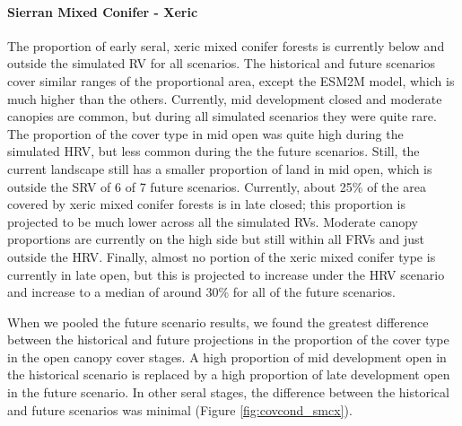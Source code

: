\documentclass[12pt]{article}
\begin{document}
\begin{spacing}{1}
\paragraph{Sierran Mixed Conifer - Xeric} The proportion of early seral, xeric mixed conifer forests is currently below and outside the simulated RV for all scenarios. The historical and future scenarios cover similar ranges of the proportional area, except the ESM2M model, which is much higher than the others. Currently, mid development closed and moderate canopies are common, but during all simulated scenarios they were quite rare. The proportion of the cover type in mid open was quite high during the simulated HRV, but less common during the the future scenarios. Still, the current landscape still has a smaller proportion of land in mid open, which is outside the SRV of 6 of 7 future scenarios. Currently, about 25\% of the area covered by xeric mixed conifer forests is in late closed; this proportion is projected to be much lower across all the simulated RVs. Moderate canopy proportions are currently on the high side but still within all FRVs and just outside the HRV. Finally, almost no portion of the xeric mixed conifer type is currently in late open, but this is projected to increase under the HRV scenario and increase to a median of around 30\% for all of the future scenarios. 

When we pooled the future scenario results, we found the greatest difference between the historical and future projections in the proportion of the cover type in the open canopy cover stages. A high proportion of mid development open in the historical scenario is replaced by a high proportion of late development open in the future scenario. In other seral stages, the difference between the historical and future scenarios was minimal (Figure \ref{fig:covcond_smcx}).


\end{spacing}
\end{document}
